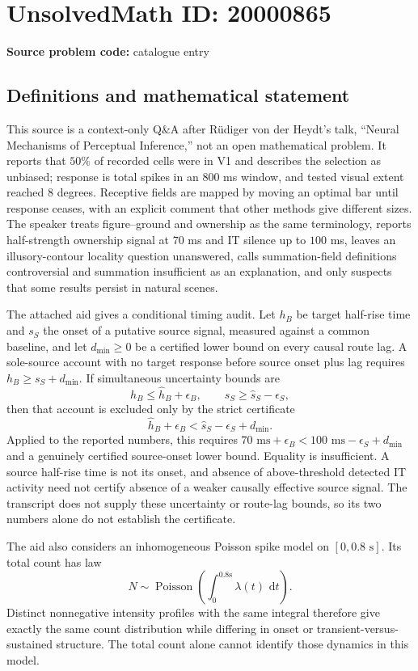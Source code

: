 \documentclass[11pt]{article}
\newcommand{\dd}{\,\mathrm{d}}
\begin{document}
\section*{UnsolvedMath ID: 20000865}
\textbf{Source problem code:} catalogue entry
\subsection{Definitions and mathematical statement}
This source is a context-only Q\&A after R\"udiger von der Heydt's talk, ``Neural Mechanisms of Perceptual Inference,'' not an open mathematical problem. It reports that $50\%$ of recorded cells were in V1 and describes the selection as unbiased; response is total spikes in an $800$ ms window, and tested visual extent reached $8$ degrees. Receptive fields are mapped by moving an optimal bar until response ceases, with an explicit comment that other methods give different sizes. The speaker treats figure--ground and ownership as the same terminology, reports half-strength ownership signal at $70$ ms and IT silence up to $100$ ms, leaves an illusory-contour locality question unanswered, calls summation-field definitions controversial and summation insufficient as an explanation, and only suspects that some results persist in natural scenes.

The attached aid gives a conditional timing audit. Let $h_B$ be target half-rise time and $s_S$ the onset of a putative source signal, measured against a common baseline, and let $d_{\min}\ge0$ be a certified lower bound on every causal route lag. A sole-source account with no target response before source onset plus lag requires $h_B\ge s_S+d_{\min}$. If simultaneous uncertainty bounds are
\[
h_B\le\widehat h_B+\epsilon_B,\qquad s_S\ge\widehat s_S-\epsilon_S,
\]
then that account is excluded only by the strict certificate
\[
\widehat h_B+\epsilon_B<\widehat s_S-\epsilon_S+d_{\min}.
\]
Applied to the reported numbers, this requires $70\text{ ms}+\epsilon_B<100\text{ ms}-\epsilon_S+d_{\min}$ and a genuinely certified source-onset lower bound. Equality is insufficient. A source half-rise time is not its onset, and absence of above-threshold detected IT activity need not certify absence of a weaker causally effective source signal. The transcript does not supply these uncertainty or route-lag bounds, so its two numbers alone do not establish the certificate.

The aid also considers an inhomogeneous Poisson spike model on $[0,0.8\text{ s}]$. Its total count has law
\[
N\sim\operatorname{Poisson}\left(\int_0^{0.8\mathrm{s}}\lambda(t)\,\dd t\right).
\]
Distinct nonnegative intensity profiles with the same integral therefore give exactly the same count distribution while differing in onset or transient-versus-sustained structure. The total count alone cannot identify those dynamics in this model.
\end{document}

